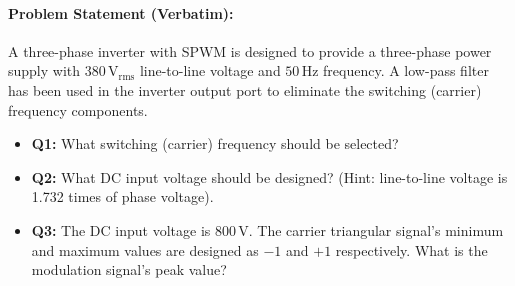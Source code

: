 \paragraph{Problem Statement (Verbatim):}
A three-phase inverter with SPWM is designed to provide a three-phase power supply with $380\,\si{\volt}_{\mathrm{rms}}$ line-to-line voltage and $50\,\si{\hertz}$ frequency. A low-pass filter has been used in the inverter output port to eliminate the switching (carrier) frequency components.
\begin{itemize}
  \item \textbf{Q1:} What switching (carrier) frequency should be selected?
  \item \textbf{Q2:} What DC input voltage should be designed? (Hint: line-to-line voltage is 1.732 times of phase voltage).
  \item \textbf{Q3:} The DC input voltage is $800\,\si{\volt}$. The carrier triangular signal's minimum and maximum values are designed as $-1$ and $+1$ respectively. What is the modulation signal's peak value?
\end{itemize}

